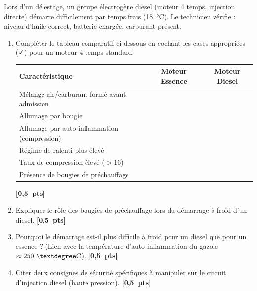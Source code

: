 \documentclass[11pt]{article}
\begin{document}
\begin{exercice}
Lors d'un délestage, un groupe électrogène diesel (moteur 4 temps, injection directe) démarre difficilement par temps frais (\SI{18}{\celsius}). Le technicien vérifie : niveau d'huile correct, batterie chargée, carburant présent.
\begin{enumerate}
    \newcommand{\bareme}[1]{\hfill\textbf{[#1~pts]}}
    \item Compléter le tableau comparatif ci-dessous en cochant les cases appropriées (✓) pour un moteur 4 temps standard.
    \begin{tabular}{|l|c|c|}
    \hline
    \textbf{Caractéristique} & \textbf{Moteur Essence} & \textbf{Moteur Diesel} \\ \hline
    Mélange air/carburant formé avant admission & & \\ \hline
    Allumage par bougie & & \\ \hline
    Allumage par auto-inflammation (compression) & & \\ \hline
    Régime de ralenti plus élevé & & \\ \hline
    Taux de compression élevé ($> 16$) & & \\ \hline
    Présence de bougies de préchauffage & & \\ \hline
    \end{tabular}
    \bareme{0,5}
    \item Expliquer le rôle des bougies de préchauffage lors du démarrage à froid d'un diesel. \bareme{0,5}
    \item Pourquoi le démarrage est-il plus difficile à froid pour un diesel que pour un essence ? (Lien avec la température d'auto-inflammation du gazole $\approx 250~°\textup{C}$). \bareme{0,5}
    \item Citer deux consignes de sécurité spécifiques à manipuler sur le circuit d'injection diesel (haute pression). \bareme{0,5}
\end{enumerate}
\end{exercice}
\end{document}
